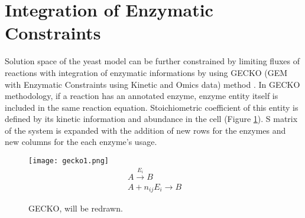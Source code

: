 \section{Integration of Enzymatic Constraints}

Solution space of the yeast model can be further constrained by limiting fluxes of reactions with integration of enzymatic informations by using GECKO (GEM with Enzymatic Constraints using Kinetic and Omics data) method \cite{sanchez2017improving}.  In GECKO methodology, if a reaction has an annotated enzyme, enzyme entity itself is included in the same reaction equation. Stoichiometric coefficient of this entity is defined by its kinetic information and abundance in the cell (Figure \ref{fig:gecko1}). S matrix of the system is expanded with the addition of new rows for the enzymes and new columns for the each enzyme's usage.

\begin{figure}[H]
\begin{center}
\texttt{[image: gecko1.png]}
\begin{align}
\label{eq:geckoreaction}
 \ A \xrightarrow{E_i} B \\
 \label{eq:gecko}
 \ A + n_{ij}E_i \xrightarrow{} B
\end{align}
\end{center}
\caption[GECKO]{GECKO, will be redrawn.}
\label{fig:gecko1}
\end{figure}

